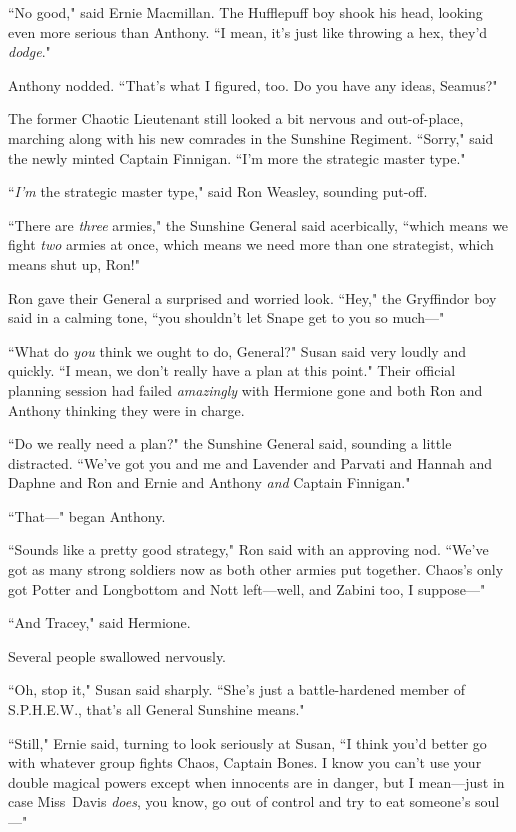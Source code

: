 ``No good," said Ernie Macmillan. The Hufflepuff boy shook his head, looking even more serious than Anthony. ``I mean, it's just like throwing a hex, they'd \emph{dodge}."

Anthony nodded. ``That's what I figured, too. Do you have any ideas, Seamus?"

The former Chaotic Lieutenant still looked a bit nervous and out-of-place, marching along with his new comrades in the Sunshine Regiment. ``Sorry," said the newly minted Captain Finnigan. ``I'm more the strategic master type."

``\emph{I'm} the strategic master type," said Ron Weasley, sounding put-off.

``There are \emph{three} armies," the Sunshine General said acerbically, ``which means we fight \emph{two} armies at once, which means we need more than one strategist, which means shut up, Ron!"

Ron gave their General a surprised and worried look. ``Hey," the Gryffindor boy said in a calming tone, ``you shouldn't let Snape get to you so much—"

``What do \emph{you} think we ought to do, General?" Susan said very loudly and quickly. ``I mean, we don't really have a plan at this point." Their official planning session had failed \emph{amazingly} with Hermione gone and both Ron and Anthony thinking they were in charge.

``Do we really need a plan?" the Sunshine General said, sounding a little distracted. ``We've got you and me and Lavender and Parvati and Hannah and Daphne and Ron and Ernie and Anthony \emph{and} Captain Finnigan."

``That—" began Anthony.

``Sounds like a pretty good strategy," Ron said with an approving nod. ``We've got as many strong soldiers now as both other armies put together. Chaos's only got Potter and Longbottom and Nott left—well, and Zabini too, I suppose—"

``And Tracey," said Hermione.

Several people swallowed nervously.

``Oh, stop it," Susan said sharply. ``She's just a battle-hardened member of S.P.H.E.W., that's all General Sunshine means."

``Still," Ernie said, turning to look seriously at Susan, ``I think you'd better go with whatever group fights Chaos, Captain Bones. I know you can't use your double magical powers except when innocents are in danger, but I mean—just in case Miss~Davis \emph{does}, you know, go out of control and try to eat someone's soul—"

